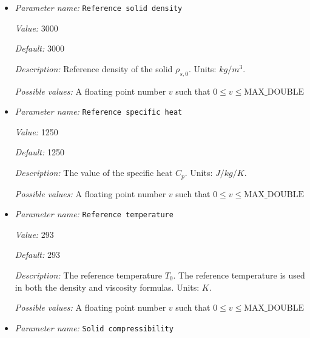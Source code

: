 \begin{itemize}
{\it Value:} 5e20


{\it Default:} 5e20


{\it Description:} The value of the constant viscosity $\eta_0$ of the solid matrix. This viscosity may be modified by both temperature and porosity dependencies. Units: $Pa \, s$.


{\it Possible values:} A floating point number $v$ such that $0 \leq v \leq \text{MAX\_DOUBLE}$
\item {\it Parameter name:} {\tt Reference solid density}
\label{parameters:Material model/Melt global/Reference solid density}


{\it Value:} 3000


{\it Default:} 3000


{\it Description:} Reference density of the solid $\rho_{s,0}$. Units: $kg/m^3$.


{\it Possible values:} A floating point number $v$ such that $0 \leq v \leq \text{MAX\_DOUBLE}$
\item {\it Parameter name:} {\tt Reference specific heat}
\label{parameters:Material model/Melt global/Reference specific heat}


{\it Value:} 1250


{\it Default:} 1250


{\it Description:} The value of the specific heat $C_p$. Units: $J/kg/K$.


{\it Possible values:} A floating point number $v$ such that $0 \leq v \leq \text{MAX\_DOUBLE}$
\item {\it Parameter name:} {\tt Reference temperature}
\label{parameters:Material model/Melt global/Reference temperature}


{\it Value:} 293


{\it Default:} 293


{\it Description:} The reference temperature $T_0$. The reference temperature is used in both the density and viscosity formulas. Units: $K$.


{\it Possible values:} A floating point number $v$ such that $0 \leq v \leq \text{MAX\_DOUBLE}$
\item {\it Parameter name:} {\tt Solid compressibility}
\label{parameters:Material model/Melt global/Solid compressibility}



\end{itemize}

